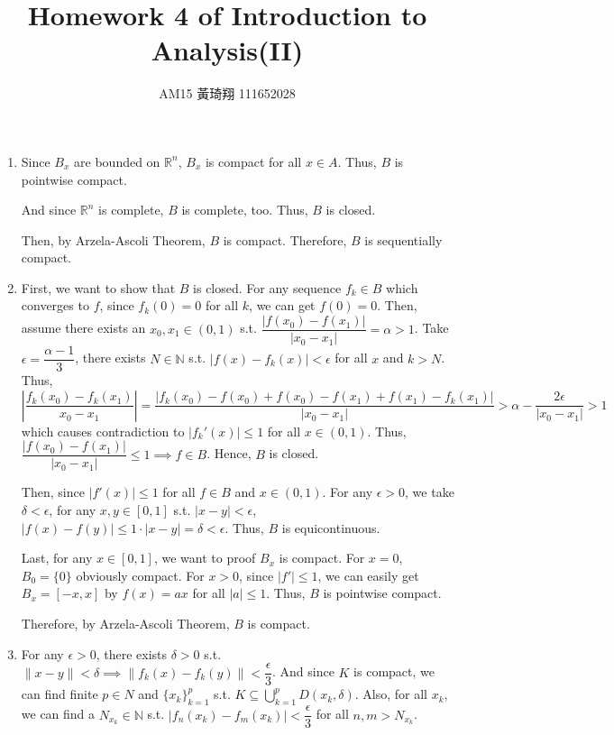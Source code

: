 \documentclass[12pt]{article}
\title{Homework 4 of Introduction to Analysis(II)}
\author{AM15 黃琦翔 111652028}
\begin{document}
\maketitle
\begin{enumerate}
    \item Since $B_x$ are bounded on $\mathbb{R}^n$, $B_x$ is compact for all $x\in A$.
    Thus, $B$ is pointwise compact.

    And since $\mathbb{R}^n$ is complete, $B$ is complete, too.
    Thus, $B$ is closed.

    Then, by Arzela-Ascoli Theorem, $B$ is compact.
    Therefore, $B$ is sequentially compact.

    \item First, we want to show that $B$ is closed.
    For any sequence $f_k \in B$ which converges to $f$, 
    since $f_k(0) = 0$ for all $k$, we can get $f(0) = 0$.
    Then, assume there exists an $x_0, x_1 \in (0, 1)$ s.t. $\dfrac{|f(x_0) - f(x_1)|}{|x_0 - x_1|} = \alpha > 1$.
    Take $\epsilon = \dfrac{\alpha-1}{3}$, there exists $N \in \mathbb{N}$ s.t. $|f(x) - f_k(x)| < \epsilon$ for all $x$ and $k > N$.
    Thus, $|\dfrac{f_k(x_0) - f_k(x_1)}{x_0 - x_1}| = \dfrac{|f_k(x_0) - f(x_0) + f(x_0) - f(x_1) + f(x_1) - f_k(x_1)|}{|x_0 - x_1|} > \alpha - \dfrac{2\epsilon}{|x_0 - x_1|} > 1$ 
    which causes contradiction to $|f_k'(x)| \leq 1$ for all $x\in (0, 1)$.
    Thus, $\dfrac{|f(x_0) - f(x_1)|}{|x_0 - x_1|} \leq 1\implies f\in B$.
    Hence, $B$ is closed.
    
    Then, since $|f'(x)| \leq 1$ for all $f\in B$ and $x\in (0, 1)$.
    For any $\epsilon > 0$, we take $\delta < \epsilon$,
    for any $x, y \in [0, 1]$ s.t. $|x - y| < \epsilon$, 
    $|f(x) - f(y)| \leq 1 \cdot |x-y| = \delta < \epsilon$.
    Thus, $B$ is equicontinuous.

    Last, for any $x \in [0, 1]$, we want to proof $B_x$ is compact.
    For $x = 0$, $B_0 = \{ 0\}$ obviously compact.
    For $x > 0$, since $|f'|\leq 1$, we can easily get $B_x = [-x, x]$ by $f(x) = ax$ for all $|a| \leq 1$.
    Thus, $B$ is pointwise compact.

    Therefore, by Arzela-Ascoli Theorem, $B$ is compact.
    
    \newpage
    \item For any $\epsilon > 0$, there exists $\delta > 0$ s.t. $\| x-y\| < \delta \implies \| f_k(x) - f_k(y)\| < \dfrac{\epsilon}{3}$.
    And since $K$ is compact, we can find finite $p\in N$ and $\{ x_k\}_{k=1}^p$ s.t. $K \subseteq \displaystyle\bigcup_{k=1}^p D(x_k, \delta)$.
    Also, for all $x_k$, we can find a $N_{x_k}\in \mathbb{N}$ s.t. $|f_n(x_k) - f_m(x_k)| < \dfrac{\epsilon}{3}$ for all $n, m > N_{x_k}$.


\end{enumerate}
\end{document}
